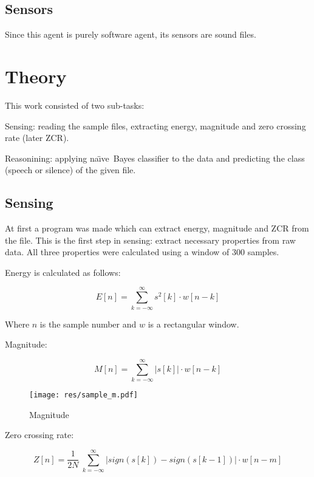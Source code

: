 \documentclass[english,11pt]{article}
\newcommand{\naive}{na\"{\i}ve\ }
\begin{document}
\subsection{Sensors}
Since this agent is purely software agent, its sensors are sound files.


\section{Theory}

This work consisted of two sub-tasks:
\begin{description}
    \item{Sensing:} reading the sample files, extracting energy, magnitude and
        zero crossing rate (later ZCR).

    \item{Reasonining:} applying \naive Bayes classifier to the data and
        predicting the class (speech or silence) of the given file.
\end{description}

\subsection{Sensing}

At first a program was made which can extract energy, magnitude and ZCR from
the file. This is the first step in sensing: extract necessary properties from
raw data. All three properties were calculated using a window of 300 samples.

Energy is calculated as follows:

$$ E[n] = \sum_{k=-\infty}^{\infty} s^2[k] \cdot w[n-k] $$

Where $n$ is the sample number and $w$ is a rectangular window.

Magnitude:

$$ M[n] = \sum_{k=-\infty}^{\infty} |s[k]| \cdot w[n-k] $$

\begin{figure}[htb]
    \centering
    \texttt{[image: res/sample\_m.pdf]}
    \caption{Magnitude}
    \label{fig:awesome_image}
\end{figure}

Zero crossing rate:

$$
    Z[n] = \frac{1}{2N} \
        \sum_{k=-\infty}^{\infty}
        |sign(s[k]) - sign(s[k-1])| \cdot w[n-m]
$$
\end{document}
